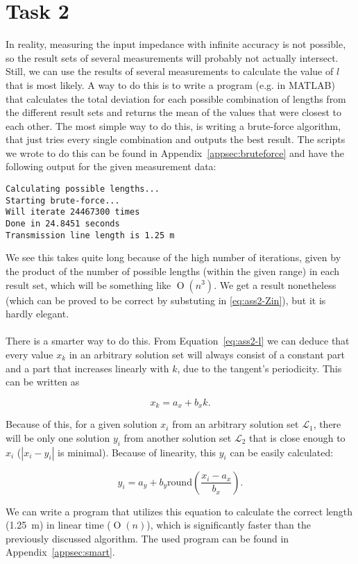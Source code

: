 \documentclass[11pt,titlepage]{report}
\begin{document}
\section{Task 2}
In reality, measuring the input impedance with infinite accuracy is not possible, so the result sets of several measurements will probably not actually intersect.
\\
Still, we can use the results of several measurements to calculate the value of $l$ that is most likely. A way to do this is to write a program (e.g. in MATLAB) that calculates the total deviation for each possible combination of lengths from the different result sets and returns the mean of the values that were closest to each other. The most simple way to do this, is writing a brute-force algorithm, that just tries every single combination and outputs the best result. The scripts we wrote to do this can be found in Appendix~\ref{appsec:bruteforce} and have the following output for the given measurement data:

\begin{verbatim}
Calculating possible lengths...
Starting brute-force...
Will iterate 24467300 times
Done in 24.8451 seconds
Transmission line length is 1.25 m
\end{verbatim}

We see this takes quite long because of the high number of iterations, given by the product of the number of possible lengths (within the given range) in each result set, which will be something like $\operatorname{O}(n^3)$. We get a result nonetheless (which can be proved to be correct by substuting in \ref{eq:ass2-Zin}), but it is hardly elegant.
\\
\\
There is a smarter way to do this. From Equation~\ref{eq:ass2-l} we can deduce that every value $x_k$ in an arbitrary solution set will always consist of a constant part and a part that increases linearly with $k$, due to the tangent's periodicity. This can be written as

\begin{equation}
	x_k = a_x + b_x k.
\end{equation}

Because of this, for a given solution $x_i$ from an arbitrary solution set $\mathcal{L_1}$, there will be only one solution $y_i$ from another solution set $\mathcal{L_2}$ that is close enough to $x_i$ ($|x_i-y_i|$ is minimal). Because of linearity, this $y_i$ can be easily calculated:

\begin{equation}
	y_i = a_y + b_y \mathrm{round}\left(\frac{x_i-a_x}{b_x}\right).
\end{equation}

We can write a program that utilizes this equation to calculate the correct length (\SI{1.25}{m}) in linear time ($\operatorname{O}(n)$), which is significantly faster than the previously discussed algorithm. The used program can be found in Appendix~\ref{appsec:smart}.

	
\end{document}
